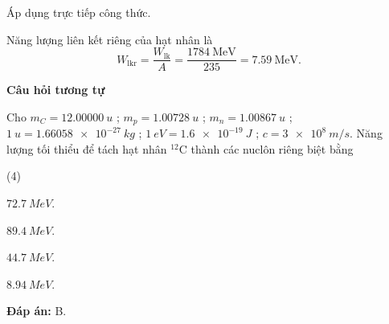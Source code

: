 \begin{dang}{Áp dụng trực tiếp công thức.}
{		Năng lượng liên kết riêng của hạt nhân là
		\begin{equation*}
			W_\text{lkr}=\dfrac{W_\text{lk}}{A}=\dfrac{\SI{1784}{\mega\electronvolt}}{235}=\SI{7,59}{\mega\electronvolt}.
		\end{equation*}
		
		\begin{center}
			\textbf{Câu hỏi tương tự}
		\end{center}
		Cho $ m_{C} = \SI{12,00000}{u} $ ; $ m_{p} = \SI{1,00728}{u} $ ; $ m_{n} = \SI{1,00867}{u} $ ; $ \SI{1}{u} = \SI{1,66058 e-27}{kg} $ ; $ \SI{1}{eV} = \SI{1,6 e-19}{J} $ ; $ c = \SI{3 e8}{m/s} $. Năng lượng tối thiểu để tách hạt nhân $ ^{12} \text{C} $ thành các nuclôn riêng biệt bằng
		\begin{mcq}(4)
			\item $ \SI{72,7}{MeV} $.
			\item $ \SI{89,4}{MeV} $.
			\item $ \SI{44,7}{MeV} $.
			\item $ \SI{8,94}{MeV} $.
		\end{mcq}
		
		\textbf{Đáp án:} B.
	}
	
\end{dang}

